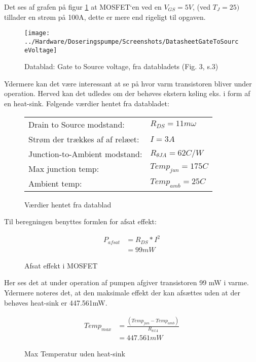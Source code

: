 Det ses af grafen på figur \ref{screenshot:GateToSourceVoltage} at MOSFET`en ved en $ V_{GS} = 5V $, (ved $T_J = 25)$ tillader en strøm på 100A, dette er mere end rigeligt til opgaven.

\begin{figure}[!h]
	\centering
	\texttt{[image: ../Hardware/Doseringspumpe/Screenshots/DatasheetGateToSourceVoltage]}
	\caption{Datablad: Gate to Source voltage, fra databladets (Fig. 3, s.3)}
	\label{screenshot:GateToSourceVoltage}
\end{figure}

Ydermere kan det være interessant at se på hvor varm transistoren bliver under operation. Herved kan det udledes om der behøves ekstern køling eks. i form af en heat-sink.
Følgende værdier hentet fra databladet: 

\begin{figure}[!h]
	\begin{center}
		\begin{tabular}{ l l }
			 Drain to Source modstand:          & $R_{DS}=11 m\omega$ \\ 
			 Strøm der trækkes af af relæet:    & $I = 3 A$ \\  
			 Junction-to-Ambient modstand:      & $R_{\theta JA}=62 C/W$ \\   
			 Max junction temp:                 & $Temp_{jun}=175 C$ \\
			 Ambient temp:                      & $Temp_{amb}=25 C$ \\
		\end{tabular}
	\end{center}
\caption{Værdier hentet fra datablad}
\end{figure}

Til beregningen benyttes formlen for afsat effekt: 

\begin{figure}[!h]
	\begin{align*}
		P_{afsat} &= R_{DS}*I^2 \\ 
		&= 99 mW
	\end{align*}
\caption{Afsat effekt i MOSFET}
\label{eq:afsatEffektMOSFET}
\end{figure}

Her ses det at under operation af pumpen afgiver transistoren 99 mW i varme. Ydermere noteres det, at den maksimale effekt der kan afsættes uden at der behøves heat-sink er 447.561mW. 

\begin{figure}[!h]
		\begin{align*}
			Temp_{max} &= \frac{(Temp_{jun}-Temp_{amb})}{R_{\theta JA}} \\ 
			&= 447.561 mW
		\end{align*}
\label{eq:maxMOSFETeffekt}
\caption{Max Temperatur uden heat-sink}
\end{figure}


